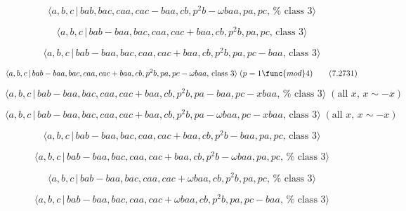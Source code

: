 \documentclass[10pt]{article}
\begin{document}
\begin{equation}
\langle a,b,c\,|\,bab,bac,caa,cac-baa,cb,p^{2}b-\omega baa,pa,pc,\,\text{%
class }3\rangle  \tag{7.2728}
\end{equation}

\begin{equation}
\langle a,b,c\,|\,bab-baa,bac,caa,cac+baa,cb,p^2b,pa,pc,\,\text{class }%
3\rangle  \tag{7.2729}
\end{equation}

\begin{equation}
\langle a,b,c\,|\,bab-baa,bac,caa,cac+baa,cb,p^2b,pa,pc-baa,\,\text{class }%
3\rangle  \tag{7.2730}
\end{equation}

\begin{equation}
\langle a,b,c\,|\,bab-baa,bac,caa,cac+baa,cb,p^{2}b,pa,pc-\omega baa,\,\text{%
class }3\rangle \;(p=1\func{mod}4)  \tag{7.2731}
\end{equation}

\begin{equation}
\langle a,b,c\,|\,bab-baa,bac,caa,cac+baa,cb,p^{2}b,pa-baa,pc-xbaa,\,\text{%
class }3\rangle \;(\text{all }x,\,x\sim -x)  \tag{7.2732}
\end{equation}

\begin{equation}
\langle a,b,c\,|\,bab-baa,bac,caa,cac+baa,cb,p^{2}b,pa-\omega baa,pc-xbaa,\,%
\text{class }3\rangle \;(\text{all }x,\,x\sim -x)  \tag{7.2733}
\end{equation}

\begin{equation}
\langle a,b,c\,|\,bab-baa,bac,caa,cac+baa,cb,p^2b-baa,pa,pc,\,\text{class }%
3\rangle  \tag{7.2734}
\end{equation}

\begin{equation}
\langle a,b,c\,|\,bab-baa,bac,caa,cac+baa,cb,p^{2}b-\omega baa,pa,pc,\,\text{%
class }3\rangle  \tag{7.2735}
\end{equation}

\begin{equation}
\langle a,b,c\,|\,bab-baa,bac,caa,cac+\omega baa,cb,p^{2}b,pa,pc,\,\text{%
class }3\rangle  \tag{7.2736}
\end{equation}

\begin{equation}
\langle a,b,c\,|\,bab-baa,bac,caa,cac+\omega baa,cb,p^{2}b,pa,pc-baa,\,\text{%
class }3\rangle  \tag{7.2737}
\end{equation}
\end{document}
